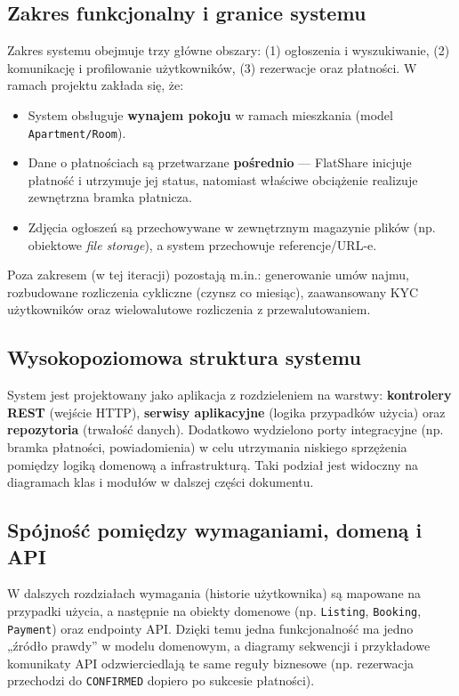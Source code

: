 \documentclass[11pt, a4paper]{article}
\begin{document}
\subsection{Zakres funkcjonalny i granice systemu}
Zakres systemu obejmuje trzy główne obszary: (1) ogłoszenia i wyszukiwanie, (2) komunikację i profilowanie użytkowników, (3) rezerwacje oraz płatności. W ramach projektu zakłada się, że:
\begin{itemize}
    \item System obsługuje \textbf{wynajem pokoju} w ramach mieszkania (model \texttt{Apartment/Room}).
    \item Dane o płatnościach są przetwarzane \textbf{pośrednio} --- FlatShare inicjuje płatność i utrzymuje jej status, natomiast właściwe obciążenie realizuje zewnętrzna bramka płatnicza.
    \item Zdjęcia ogłoszeń są przechowywane w zewnętrznym magazynie plików (np. obiektowe \textit{file storage}), a system przechowuje referencje/URL-e.
\end{itemize}
Poza zakresem (w tej iteracji) pozostają m.in.: generowanie umów najmu, rozbudowane rozliczenia cykliczne (czynsz co miesiąc), zaawansowany KYC użytkowników oraz wielowalutowe rozliczenia z przewalutowaniem.

\subsection{Wysokopoziomowa struktura systemu}
System jest projektowany jako aplikacja z rozdzieleniem na warstwy: \textbf{kontrolery REST} (wejście HTTP), \textbf{serwisy aplikacyjne} (logika przypadków użycia) oraz \textbf{repozytoria} (trwałość danych). Dodatkowo wydzielono porty integracyjne (np. bramka płatności, powiadomienia) w celu utrzymania niskiego sprzężenia pomiędzy logiką domenową a infrastrukturą. Taki podział jest widoczny na diagramach klas i modułów w dalszej części dokumentu.

\subsection{Spójność pomiędzy wymaganiami, domeną i API}
W dalszych rozdziałach wymagania (historie użytkownika) są mapowane na przypadki użycia, a następnie na obiekty domenowe (np. \texttt{Listing}, \texttt{Booking}, \texttt{Payment}) oraz endpointy API. Dzięki temu jedna funkcjonalność ma jedno „źródło prawdy” w modelu domenowym, a diagramy sekwencji i przykładowe komunikaty API odzwierciedlają te same reguły biznesowe (np. rezerwacja przechodzi do \texttt{CONFIRMED} dopiero po sukcesie płatności).
\end{document}
